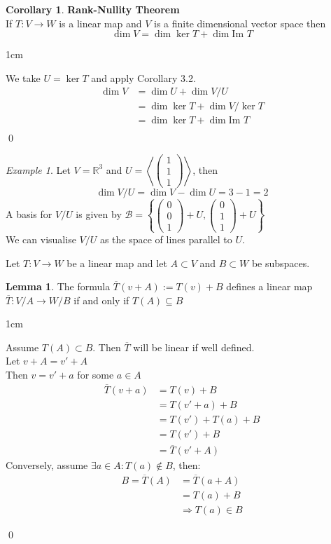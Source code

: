 \documentclass[11pt, a4paper]{report}
\makeatletter
\numberwithin{equation}{section}
\newcommand{\R}{\mathbb{R}}
\newcommand{\spn}[1]{\left\langle #1 \right\rangle}
\newcommand{\im}{\text{Im }}
\newcommand{\nin}{\not\in}
\newcommand{\smp}[1]{\left(\begin{smallmatrix}#1\end{smallmatrix}\right)}
\numberwithin{equation}{subsection}
\theoremstyle{plain}
\theoremstyle{definition}
\newtheorem{lem}[thm]{Lemma}
\newtheorem{cor}[thm]{Corollary}
\theoremstyle{remark}
\newtheorem{exmp}{Example}[chapter]
\newtheorem*{prf}{Proof}
\renewenvironment{prf}[1][\proofname]{\par
  \vspace{-\topsep}%
  \normalfont
  \topsep0pt \partopsep0pt %
  \trivlist
  \item[\hskip\labelsep
        \itshape
    #1\@addpunct{.}]\ignorespaces
}{%
  \popQED\endtrivlist\@endpefalse
  \addvspace{6pt plus 6pt} %
}
\newcommand{\pr}[1]{\begin{adjustwidth}{1cm}{} \begin{prf} #1 \end{prf} \end{adjustwidth}}
\makeatother
\begin{document}
\begin{cor} \textbf{Rank-Nullity Theorem}\\
If $T: V \to W$ is a linear map and $V$ is a finite dimensional vector space then $$\dim V = \dim \ker T + \dim \im T$$
\pr{
We take $U = \ker T$ and apply Corollary 3.2.
\begin{align*}
\dim V	&= \dim U + \dim V/U\\
		&= \dim \ker T + \dim V/\ker T\\
		&= \dim \ker T + \dim \im T \tag{By First Isomorphism Theorem}\\
\end{align*} \qed
}
\end{cor}

\begin{exmp} Let $V = \R^3$ and $U = \spn{\smp{1\\1\\1}}$, then $$\dim V/U = \dim V - \dim U = 3 - 1 = 2$$
A basis for $V/U$ is given by $\mathcal{B} = \left\{ \smp{0\\0\\1} + U, \smp{0\\1\\1} + U \right\}$\\ We can visualise $V/U$ as the space of lines parallel to $U$. \end{exmp}

Let $T: V \to W$ be a linear map and let $A \subset V$ and $B \subset W$ be subspaces.

\begin{lem} The formula $\overline{T}(v + A) := T(v) + B$ defines a linear map $\overline{T} : V/A \to W/B$ if and only if $T(A) \subseteq B$ \end{lem}

\pr{
Assume $T(A) \subset B$. Then $\overline{T}$ will be linear if well defined.\\ Let $v + A = v' + A$\\ Then $v = v' + a$ for some $a \in A$
\begin{align*}
\overline{T}(v + a)		&= T(v) + B\\
						&= T(v' + a) + B\\
						&= T(v') + T(a) + B\\
						&= T(v') + B \tag{$T(a) \in B$}\\
						&= \overline{T}(v' + A)
\end{align*}
Conversely, assume $\exists a \in A : T(a) \nin B$, then:
\begin{align*}
B = \overline{T}(A) 	&= \overline{T}(a + A)\\
						&= T(a) + B\\
						&\Rightarrow T(a) \in B \tag{CONTRADICTION}
\end{align*}
}\qed
\end{document}
